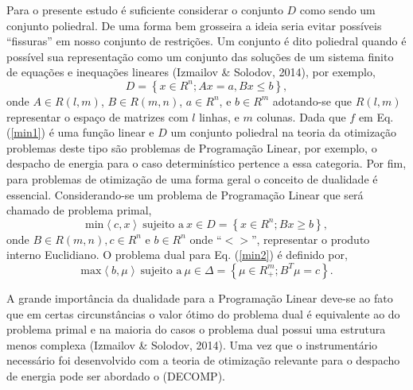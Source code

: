 \documentclass[12pt,fleqn]{article}
\begin{document}
Para o presente estudo \'e suficiente considerar o conjunto $D$ como sendo um conjunto poliedral. De uma forma bem grosseira a ideia seria evitar
poss\'iveis ``fissuras'' em nosso conjunto de restri\c c\~oes. Um conjunto  \'e dito poliedral quando \'e poss\'ivel sua representa\c c\~ao como um conjunto das solu\c c\~oes de um
sistema finito de equa\c c\~oes e inequa\c c\~oes lineares (Izmailov \& Solodov, 2014), por exemplo,
\begin{equation*}
  D = \left\{ x \in {R}^{n}; Ax = a, Bx \leq b\right\},
\end{equation*}
onde $A \in R(l,m)$, $B \in R(m,n)$, $a \in {R}^{n}$, e $b \in {R}^{m}$ adotando-se que $R(l,m)$ representar o
espa\c co de matrizes com $l$ linhas, e $m$ colunas. Dada que $f$ em Eq.(\ref {min1}) \'e uma fun\c c\~ao linear e $D$ um conjunto
poliedral na teoria da otimiza\c c\~ao problemas deste tipo s\~ao problemas de Programa\c c\~ao Linear, por exemplo, o despacho de energia
para o caso determin\'istico pertence a essa categoria. Por fim, para problemas de otimiza\c c\~ao de uma forma geral o conceito de dualidade \'e
essencial. Considerando-se um problema de Programa\c c\~ao Linear que ser\'a chamado de problema primal,
\begin{equation}
  \text{min} \left < c,x \right > \ \text{sujeito a} \ x \in D = \left\{ x \in {R}^{n}; Bx \geq b \right\}, 
  \label{min2}
\end{equation}
onde $B \in R(m,n), c \in {R}^{n}$ e $b \in {R}^{n}$ onde ``$< >$'', representar o produto interno Euclidiano.
O problema dual para Eq. (\ref{min2}) \'e definido por,
\begin{equation}
  \text{max} \left < b, \mu \right > \ \text{sujeito a} \ \mu \in \Delta = \left\{ \mu \in R_+^m;
  {B}^{T} \mu = c \right\}.
\end{equation}

A grande import\^ancia da dualidade para a Programa\c c\~ao Linear deve-se ao fato que em certas circunst\^ancias o valor \'otimo do problema dual \'e equivalente ao do
problema primal e na maioria do casos o problema dual possui uma estrutura menos complexa (Izmailov \& Solodov, 2014). Uma
vez que o instrument\'ario necess\'ario foi desenvolvido com a teoria de otimiza\c c\~ao relevante para o despacho de
energia pode ser abordado o (DECOMP). 
\end{document}

